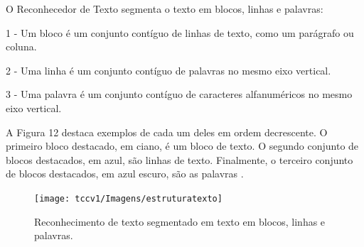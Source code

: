 O Reconhecedor de Texto segmenta o texto em blocos, linhas e palavras:

1 - Um bloco é um conjunto contíguo de linhas de texto, como um parágrafo ou coluna.

2 - Uma linha é um conjunto contíguo de palavras no mesmo eixo vertical.

3 - Uma palavra é um conjunto contíguo de caracteres alfanuméricos no mesmo eixo vertical.

A Figura 12 destaca exemplos de cada um deles em ordem decrescente. O primeiro bloco destacado, em ciano, é um bloco de texto. O segundo conjunto de blocos destacados, em azul, são linhas de texto. Finalmente, o terceiro conjunto de blocos destacados, em azul escuro, são as palavras \cite{MOBILEVISION}.

 \begin{figure}[h]
	\centering
	\texttt{[image: tccv1/Imagens/estruturatexto]} 
	\caption[Reconhecimento de texto segmentado em texto em blocos, linhas e palavras.]{Reconhecimento de texto segmentado em texto em blocos, linhas e palavras.}
	\label{fig:tux_laplace}
\end{figure}
